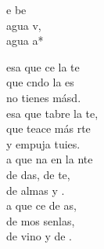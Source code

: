 \begin{cancion}%
	\begin{chorus}%
	e be \\
	 agua v,\\
	 agua a*\\
	\end{chorus}%
	esa que ce la te \\
	que cndo la es \\
	no tienes másd. \\
	esa que tabre la te,  \\
	que teace más rte  \\
	y empuja tuies.\\
	a que na en la nte  \\
	de das, de te,  \\
	de almas y . \\
	a que ce de as, \\
	de mos senlas,  \\
	de vino y de . \\
\end{cancion}%
